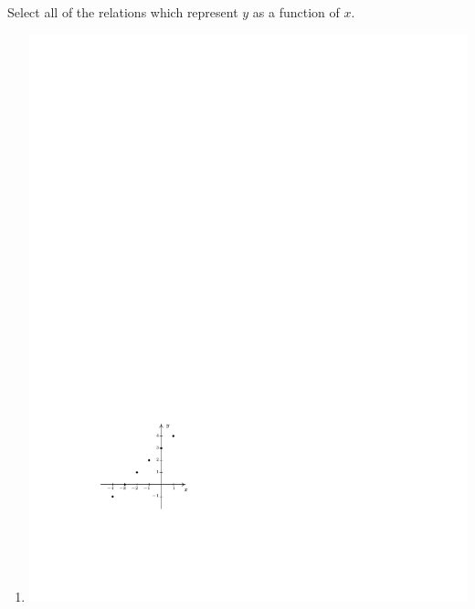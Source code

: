 \documentclass{ximera}
\author{Elizabeth Miller}
\begin{document}
\licenseSZ
\begin{exercise}
Select all of the relations which represent  $y$ as a function of $x$.
\begin{enumerate}
  \item{\includegraphics{WiaFgraphs1-1}}

\end{enumerate}
\end{exercise}
\end{document}
